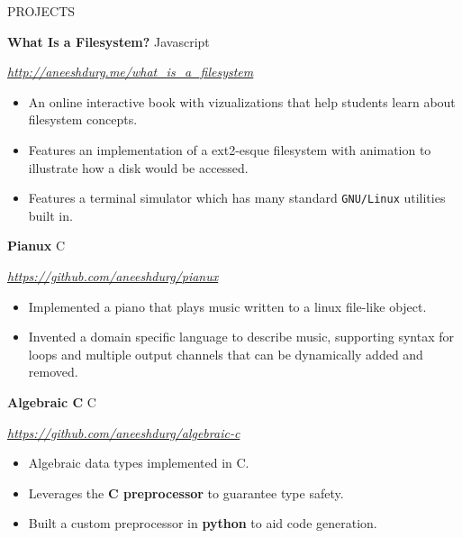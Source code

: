 \documentclass[paper=a4,fontsize=10pt]{scrartcl} %
\newcommand{\sepspace}{\vspace*{1em}}		%
\newcommand{\NewPart}[1]{ \noindent \large \usefont{OT1}{phv}{b}{n}\uppercase{#1} \normalfont \normalsize}
\newcommand{\EducationEntry}[4]{
		\noindent \textbf{#1}     %
			\hfill#2 \par  %
		\noindent \textit{#3} \par        %
		\noindent\hangafter=0 \small #4 %
		\normalsize \par}
\begin{document}
\begin{minipage}[t]{0.75\textwidth}


\sepspace
\NewPart{Projects}{}

\EducationEntry{What Is a Filesystem?}{Javascript}{\url{http://aneeshdurg.me/what_is_a_filesystem}}{
\begin{itemize}
\item An online interactive book with vizualizations that help students learn about filesystem concepts.
\item Features an implementation of a ext2-esque filesystem with animation to illustrate how a disk would be accessed.
\item Features a terminal simulator which has many standard \texttt{GNU/Linux} utilities built in.%
\end{itemize}
}

\EducationEntry{Pianux}{C}{\url{https://github.com/aneeshdurg/pianux}}{
\begin{itemize}
\item Implemented a piano that plays music written to a linux file-like object.
\item Invented a domain specific language to describe music, supporting syntax for loops and multiple output channels that can be dynamically added and removed.
\end{itemize}
}

\EducationEntry{Algebraic C}{C}{\url{https://github.com/aneeshdurg/algebraic-c}}{
\begin{itemize}
\item Algebraic data types implemented in C.
\item Leverages the \textbf{C preprocessor} to guarantee type safety.
\item Built a custom preprocessor in \textbf{python} to aid code generation.
\end{itemize}
}


\end{minipage}
\end{document}
